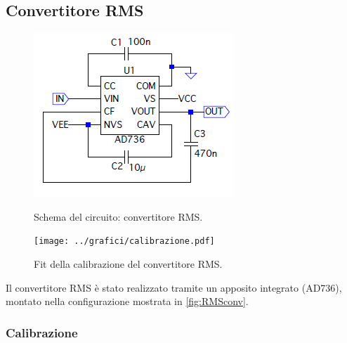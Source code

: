 \documentclass[a4paper,10pt]{article}
\begin{document}
\subsection{Convertitore RMS}
\vspace*{-30pt}
\begin{figure}[H]
	\begin{minipage}{0.34\textwidth}
		\vspace{-10pt}
		\centering
		\includegraphics[width=\textwidth]{../grafici/RMSconverter.png}
		\vspace{-12pt}
		\caption{Schema del circuito: convertitore RMS.}
		\label{fig:RMSconv}
		\vspace{-6pt}
	\end{minipage}
	\begin{minipage}{0.64\textwidth}
		\centering
		\texttt{[image: ../grafici/calibrazione.pdf]}
		\vspace*{-20pt}
		\caption{Fit della calibrazione del convertitore RMS.}
		\label{fig:FitRMS}
	\end{minipage}
\end{figure}

Il convertitore RMS è stato realizzato tramite un apposito integrato (AD736), montato nella configurazione mostrata in \cref{fig:RMSconv}.
\vspace*{-8pt}
\subsubsection*{Calibrazione}
\end{document}
